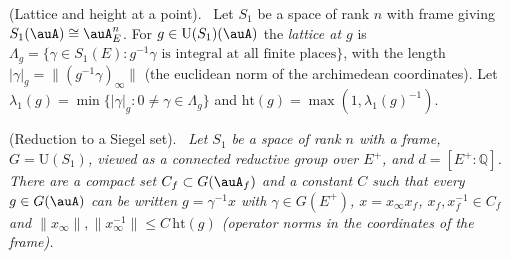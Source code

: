 \documentclass[10pt]{amsart}
\theoremstyle{definition}
\theoremstyle{remark}
\newcommand{\Q}{\mathbb Q}
\providecommand{\auU}{\mathrm U}
\newenvironment{quotedthm}[2]{\par\medskip\noindent\begingroup
  \textbf{#1}#2.\ \itshape\ignorespaces}{\endgroup\par\medskip}
\newenvironment{quoteddef}[2]{\par\medskip\noindent\begingroup
  \textbf{#1}#2.\ \ignorespaces}{\endgroup\par\medskip}
\begin{document}
\begin{quoteddef}{\cite[Definition~3.27]{P53}}{ (Lattice and height at a point)}
Let $S_1$ be a space of rank $n$ with frame giving $S_1(\auA)\cong\auA_E^n$. For $g\in\auU(S_1)(\auA)$
the \emph{lattice at $g$} is $\Lambda_g=\{\gamma\in S_1(E): g^{-1}\gamma\text{ is integral at all
finite places}\}$, with the length $|\gamma|_g=\|(g^{-1}\gamma)_\infty\|$ (the euclidean norm of the
archimedean coordinates). Let $\lambda_1(g)=\min\{|\gamma|_g:0\ne\gamma\in\Lambda_g\}$ and
$\mathrm{ht}(g)=\max(1,\lambda_1(g)^{-1})$.
\end{quoteddef}

\begin{quotedthm}{\cite[Lemma~3.28]{P53}}{ (Reduction to a Siegel set)}
Let $S_1$ be a space of rank $n$ with a frame, $G=\auU(S_1)$, viewed as a connected reductive group over
$E^+$, and $d=[E^+:\Q]$. There are a compact set $C_f\subset G(\auA_f)$ and a constant $C$ such that every
$g\in G(\auA)$ can be written $g=\gamma^{-1}x$ with $\gamma\in G(E^+)$, $x=x_\infty x_f$, $x_f,x_f^{-1}\in C_f$
and $\|x_\infty\|,\|x_\infty^{-1}\|\le C\,\mathrm{ht}(g)$ (operator norms in the
coordinates of the frame).
\end{quotedthm}
\end{document}
